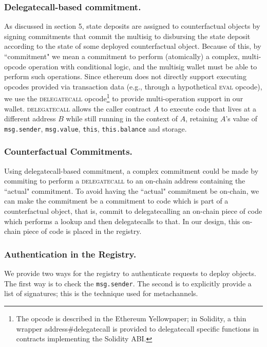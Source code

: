 \documentclass[prb,floatfix,reprint,nofootinbib,amsmath,amssymb,epsfig,pre,floats,letterpaper,groupedaffiliation,tightenlines,allcolors=blue,11pt]{revtex4}
\theoremstyle{definition}
\theoremstyle{definition}
\theoremstyle{definition}
\begin{document}
\subsubsection{Delegatecall-based commitment.} As discussed in section 5, state deposits are assigned to counterfactual objects by signing commitments that commit the multisig to disbursing the state deposit according to the state of some deployed counterfactual object. Because of this, by ``commitment" we mean a commitment to perform (atomically) a complex, multi-opcode operation with conditional logic, and the multisig wallet must be able to perform such operations. Since ethereum does not directly support executing opcodes provided via transaction data (e.g., through a hypothetical \textsc{eval} opcode), we use the \textsc{delegatecall} opcode\footnote{The opcode is described in the Ethereum Yellowpaper\cite{Wood_2017}; in Solidity, a thin wrapper \textsf{address\#delegatecall} is provided\cite{Solidity_2018} to delegatecall specific functions in contracts implementing the Solidity ABI.} to provide multi-operation support in our wallet. \textsc{delegatecall} allows the caller contract $A$ to execute code that lives at a different address $B$ while still running in the context of $A$, retaining $A$'s value of \texttt{msg.sender}, \texttt{msg.value}, \texttt{this}, \texttt{this.balance} and storage.

\subsubsection{Counterfactual Commitments.} Using delegatecall-based commitment, a complex commitment could be made by commiting to perform a \textsc{delegatecall} to an on-chain address containing the ``actual" commitment. To avoid having the ``actual" commitment be on-chain, we can make the commitment be a commitment to code which is part of a counterfactual object, that is, commit to delegatecalling an on-chain piece of code which performs a lookup and then delegatecalls to that. In our design, this on-chain piece of code is placed in the registry.

\subsubsection{Authentication in the Registry.} We provide two ways for the registry to authenticate requests to deploy objects. The first way is to check the \texttt{msg.sender}. The second is to explicitly provide a list of signatures; this is the technique used for metachannels.
\end{document}
